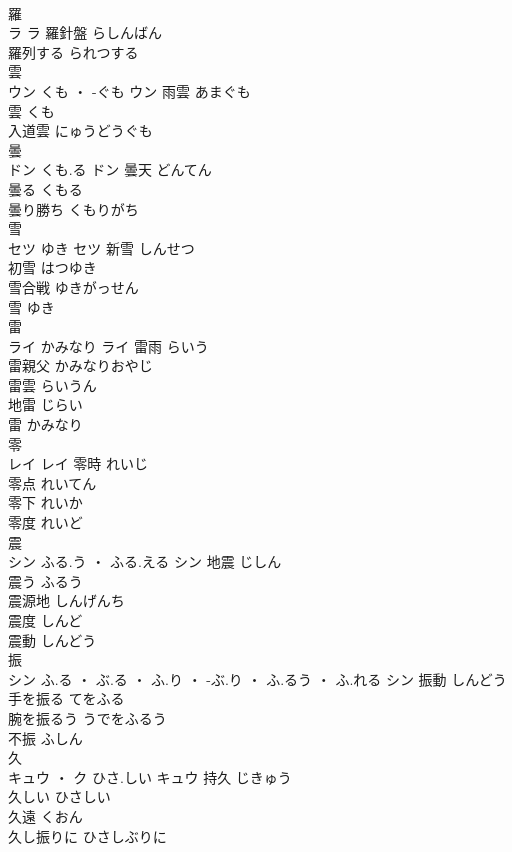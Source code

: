 \documentclass[8pt]{extreport}
\begin{document}
\begin{CJK}{UTF8}{min}
\\	羅	
\\	ラ		ラ	羅針盤	らしんばん	
\\	羅列する	られつする	
\\	雲	
\\	ウン	くも ・ -ぐも	ウン	雨雲	あまぐも	
\\	雲	くも	
\\	入道雲	にゅうどうぐも	
\\	曇	
\\	ドン	くも.る	ドン	曇天	どんてん	
\\	曇る	くもる	
\\	曇り勝ち	くもりがち	
\\	雪	
\\	セツ	ゆき	セツ	新雪	しんせつ	
\\	初雪	はつゆき	
\\	雪合戦	ゆきがっせん	
\\	雪	ゆき	
\\	雷	
\\	ライ	かみなり	ライ	雷雨	らいう	
\\	雷親父	かみなりおやじ	
\\	雷雲	らいうん	
\\	地雷	じらい	
\\	雷	かみなり	
\\	零	
\\	レイ		レイ	零時	れいじ	
\\	零点	れいてん	
\\	零下	れいか	
\\	零度	れいど	
\\	震	
\\	シン	ふる.う ・ ふる.える	シン	地震	じしん	
\\	震う	ふるう	
\\	震源地	しんげんち	
\\	震度	しんど	
\\	震動	しんどう	
\\	振	
\\	シン	ふ.る ・ ぶ.る ・ ふ.り ・ -ぶ.り ・ ふ.るう ・ ふ.れる	シン	振動	しんどう	
\\	手を振る	てをふる	
\\	腕を振るう	うでをふるう	
\\	不振	ふしん	
\\	久	
\\	キュウ ・ ク	ひさ.しい	キュウ	持久	じきゅう	
\\	久しい	ひさしい	
\\	久遠	くおん	
\\	久し振りに	ひさしぶりに	

\end{CJK}
\end{document}
